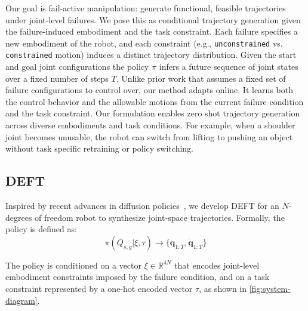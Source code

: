 Our goal is fail-active manipulation: generate functional, feasible trajectories under joint-level failures. We pose this as conditional trajectory generation given the failure-induced embodiment and the task constraint. Each failure specifies a new embodiment of the robot, and each constraint (e.g., \texttt{unconstrained} vs. \texttt{constrained} motion) induces a distinct trajectory distribution. Given the start and goal joint configurations  the policy $\pi$ infers a future sequence of joint states over a fixed number of steps $T$. Unlike prior work that assumes a fixed set of failure configurations to control over, our method adapts online. It learns both the control behavior and the allowable motions from the current failure condition and the task constraint.
Our formulation enables zero shot trajectory generation across diverse embodiments and task conditions. For example, when a shoulder joint becomes unusable, the robot can switch from lifting to pushing an object without task specific retraining or policy switching.

\subsection{DEFT}
Inspired by recent advances in diffusion policies~\cite{chi2023diffusion}, we develop DEFT for an $N$-degrees of freedom robot to synthesize joint-space trajectories. Formally, the policy is defined as:
\begin{equation}
\pi(Q_{s,g}| \xi, \tau) \rightarrow \{\textbf{q}_{1:T}, \dot{\textbf{q}}_{1:T}\}
\end{equation}

The policy is conditioned on a vector $\xi \in \mathbb{R}^{4N}$ that encodes joint-level embodiment constraints imposed by the failure condition, and on a task constraint represented by a one-hot encoded vector $\tau$, as shown in \cref{fig:system-diagram}.

